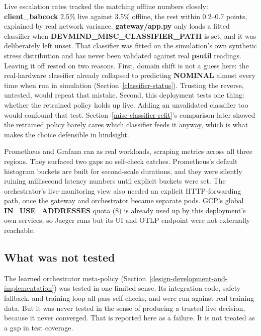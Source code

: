 \begin{itemize}
Live escalation rates tracked the matching offline numbers closely:
\textbf{client\_babcock} 2.5\% live against 3.5\% offline, the rest
within 0.2--0.7 points, explained by real network variance.
\textbf{gateway/app.py} only loads a fitted classifier when
\textbf{DEVMIND\_MISC\_CLASSIFIER\_PATH} is set, and it was
deliberately left unset. That classifier was fitted on the
simulation's own synthetic stress distribution and has never been
validated against real \textbf{psutil} readings. Leaving it off rested
on two reasons. First, domain shift is not a guess here: the
real-hardware classifier already collapsed to
predicting \textbf{NOMINAL} almost every time when run in simulation
(Section~\ref{classifier-status}). Trusting the reverse, untested,
would repeat that mistake. Second, this deployment tests one thing:
whether the retrained policy holds up live. Adding an unvalidated
classifier too would confound that test.
Section~\ref{misc-classifier-refit}'s comparison later showed the
retrained policy barely cares which classifier feeds it anyway, which
is what makes the choice defensible in hindsight.

Prometheus and Grafana ran as real workloads, scraping metrics across
all three regions. They surfaced two gaps no self-check catches.
Prometheus's default histogram buckets are built for second-scale
durations, and they were silently ruining millisecond latency numbers
until explicit buckets were set. The orchestrator's live-monitoring
view also needed an explicit HTTP-forwarding path, once the gateway and
orchestrator became separate pods. GCP's global \textbf{IN\_USE\_ADDRESSES}
quota (8) is already used up by this deployment's own services, so
Jaeger runs but its UI and OTLP endpoint were not externally reachable.
\end{itemize}

\hypertarget{what-was-not-tested}{%
\subsection{What was not tested}\label{what-was-not-tested}}

The learned orchestrator meta-policy (Section~\ref{design-development-and-implementation}) 
was tested in one limited sense. Its integration code, safety fallback, and training loop
all pass self-checks, and were run against real training data. But it
was never tested in the sense of producing a trusted live decision,
because it never converged. That is reported here as a failure. It is
not treated as a gap in test coverage.